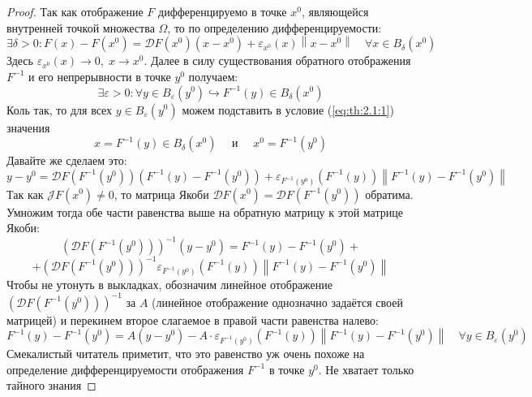\documentclass[11pt]{article}
\begin{document}
\begin{proof}
    Так как отображение $F$ дифференцируемо в точке $x^0$, являющейся внутренней точкой множества $\Omega$, то 
    по определению дифференцируемости:
    \begin{equation*} \label{eq:th:2.1:1} \tag{$\star$}
        \exists \delta > 0: F\left(x\right) - F\left(x^0\right) = \mathcal{D} F \left(x^0\right) \left(x - x^0\right) + \varepsilon_{x^0} (x) \left\lVert x - x^0 \right\rVert \quad \forall x \in B_{\delta} \left(x^0\right)
    \end{equation*}
    Здесь $\varepsilon_{x^0} (x) \to 0, \; x \to x^0$. Далее в силу существования обратного отображения $F^{-1}$ и его непрерывности в точке $y^0$ получаем:
    \[\exists \varepsilon > 0: \forall y \in B_{\varepsilon} \left(y^0\right) \hookrightarrow F^{-1} (y) \in B_{\delta} \left(x^0\right)\]
    Коль так, то для всех $y \in B_{\varepsilon}\left(y^0\right)$ можем подставить в условие (\ref{eq:th:2.1:1}) значения 
    \[x = F^{-1}(y) \in B_{\delta}\left(x^0\right) \quad \text{ и } \quad x^0 = F^{-1}\left(y^0\right)\]
    Давайте же сделаем это:
    \[y - y^0 = \mathcal{D} F \left(F^{-1}\left(y^0\right)\right) \left(F^{-1}\left(y\right) - F^{-1}\left(y^0\right)\right) + \varepsilon_{F^{-1}\left(y^0\right)} \left(F^{-1}\left(y\right)\right) \left\lVert F^{-1}\left(y\right) - F^{-1}\left(y^0\right) \right\rVert \]
    Так как $\mathcal{J} F \left(x^0\right) \neq 0$, то матрица Якоби $\mathcal{D} F \left(x^0\right) = \mathcal{D} F\left(F^{-1}\left(y^0\right)\right)$ обратима. Умножим тогда обе части равенства выше на обратную матрицу к этой матрице Якоби:
    \[\left(\mathcal{D} F \left(F^{-1}\left(y^0\right)\right)\right)^{-1} \left(y - y^0\right) = F^{-1}\left(y\right) - F^{-1}\left(y^0\right) + \]
    \[+ \left(\mathcal{D} F \left(F^{-1}\left(y^0\right)\right)\right)^{-1} \varepsilon_{F^{-1}\left(y^0\right)} \left(F^{-1}\left(y\right)\right) \left\lVert F^{-1}\left(y\right) - F^{-1}\left(y^0\right) \right\rVert\]
    Чтобы не утонуть в выкладках, обозначим линейное отображение $\left(\mathcal{D} F \left(F^{-1}\left(y^0\right)\right)\right)^{-1}$ за $A$ (линейное отображение однозначно задаётся своей матрицей) и перекинем второе слагаемое в правой части равенства налево:
    \[F^{-1}\left(y\right) - F^{-1}\left(y^0\right) = A\left(y - y^0\right) - A \cdot \varepsilon_{F^{-1}\left(y^0\right)} \left(F^{-1}\left(y\right)\right) \left\lVert F^{-1}\left(y\right) - F^{-1}\left(y^0\right) \right\rVert \quad  \forall y \in B_{\varepsilon}\left(y^0\right)\]
    Смекалистый читатель приметит, что это равенство уж очень похоже на определение дифференцируемости отображения $F^{-1}$ в точке $y^0$. Не хватает только тайного знания 

\end{proof}
\end{document}
